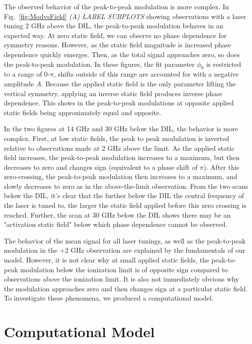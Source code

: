 \documentclass[aps,pra,preprint,groupedaddress]{revtex4-1}
\begin{document}
The observed behavior of the peak-to-peak modulation is more complex. In Fig.~\ref{fig:ModvsField} \emph{(A) LABEL SUBPLOTS} showing observations with a laser tuning 2 GHz above the DIL, the peak-to-peak modulation behaves in an expected way. At zero static field, we can observe no phase dependence for symmetry reasons. However, as the static field magnitude is increased phase dependence quickly emerges. Then, as the total signal approaches zero, so does the peak-to-peak modulation. In these figures, the fit parameter $\phi_0$ is restricted to a range of 0-$\pi$, shifts outside of this range are accounted for with a negative amplitude $A$. Because the applied static field is the only parameter lifting the vertical symmetry, applying an inverse static field produces inverse phase dependence. This shows in the peak-to-peak modulations at opposite applied static fields being approximately equal and opposite.

In the two figures at 14 GHz and 30 GHz below the DIL, the behavior is more complex. First, at low static fields, the peak to peak modulation is inverted relative to observations made at 2 GHz above the limit. As the applied static field increases, the peak-to-peak modulation increases to a maximum, but then decreases to zero and changes sign (equivalent to a phase shift of $\pi$). After this zero-crossing, the peak-to-peak modulation then increases to a maximum, and slowly decreases to zero as in the above-the-limit observation. From the two scans below the DIL, it's clear that the further below the DIL the central frequency of the laser is tuned to, the larger the static field applied before this zero crossing is reached. Further, the scan at 30 GHz below the DIL shows there may be an "activation static field" below which phase dependence cannot be observed.

The behavior of the mean signal for all laser tunings, as well as the peak-to-peak modulation in the +2 GHz observation are explained by the fundamentals of our model. However, it is not clear why at small applied static fields, the peak-to-peak modulation below the ionization limit is of opposite sign compared to observations above the ionization limit. It is also not immediately obvious why the modulation approaches zero and then changes sign at a particular static field. To investigate these phenomena, we produced a computational model.

\section{\label{sec:comp} Computational Model}
\end{document}
